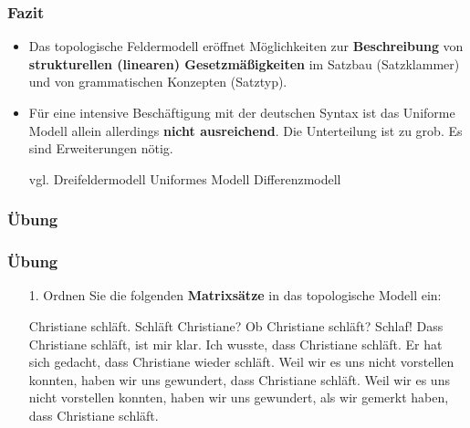 \begin{frame}
\frametitle{Fazit}

\begin{itemize}
	\item Das topologische Feldermodell eröffnet Möglichkeiten zur \textbf{Beschreibung} von \textbf{strukturellen (linearen) Gesetzmäßigkeiten} im Satzbau (\zB Satzklammer) und von grammatischen Konzepten (\zB Satztyp).
	\item[]
	\item Für eine intensive Beschäftigung mit der deutschen Syntax ist das Uniforme Modell allein allerdings \textbf{nicht ausreichend}. Die Unterteilung ist zu grob. Es sind Erweiterungen nötig. 
	
	vgl. Dreifeldermodell \ras Uniformes Modell \ras Differenzmodell

\end{itemize}

\end{frame}

\subsubsection{Übung}





\begin{frame}
\frametitle{Übung}

\begin{itemize}
	\item[1.] Ordnen Sie die folgenden \textbf{Matrixsätze} in das topologische Modell ein:


\eal
\ex Christiane schläft.
\ex Schläft Christiane?
\ex Ob Christiane schläft?
\ex Schlaf!
\ex Dass Christiane schläft, ist mir klar.
\ex Ich wusste, dass Christiane schläft.
\ex Er hat sich gedacht, dass Christiane wieder schläft.
\ex Weil wir es uns nicht vorstellen konnten, haben wir uns gewundert, dass Christiane schläft.
\ex Weil wir es uns nicht vorstellen konnten, haben wir uns gewundert, als wir gemerkt haben, dass Christiane schläft.
\zl

\end{itemize}

\end{frame}

